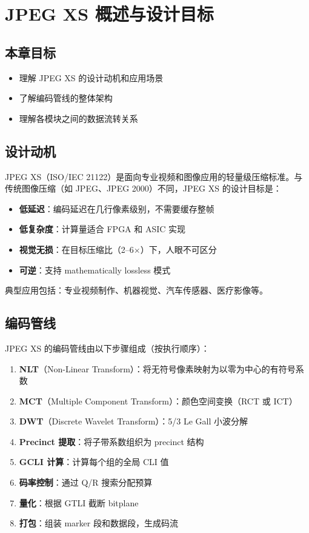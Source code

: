 
\chapter{JPEG XS 概述与设计目标}\label{ch:overview}

\section{本章目标}

\begin{itemize}
  \item 理解 JPEG XS 的设计动机和应用场景
  \item 了解编码管线的整体架构
  \item 理解各模块之间的数据流转关系
\end{itemize}

\section{设计动机}

JPEG XS（ISO/IEC 21122）是面向专业视频和图像应用的轻量级压缩标准。与传统图像压缩（如 JPEG、JPEG 2000）不同，JPEG XS 的设计目标是：

\begin{itemize}
  \item \textbf{低延迟}：编码延迟在几行像素级别，不需要缓存整帧
  \item \textbf{低复杂度}：计算量适合 FPGA 和 ASIC 实现
  \item \textbf{视觉无损}：在目标压缩比（2--6$\times$）下，人眼不可区分
  \item \textbf{可逆}：支持 mathematically lossless 模式
\end{itemize}

典型应用包括：专业视频制作、机器视觉、汽车传感器、医疗影像等。

\section{编码管线}

JPEG XS 的编码管线由以下步骤组成（按执行顺序）：

\begin{enumerate}
  \item \textbf{NLT}（Non-Linear Transform）：将无符号像素映射为以零为中心的有符号系数
  \item \textbf{MCT}（Multiple Component Transform）：颜色空间变换（RCT 或 ICT）
  \item \textbf{DWT}（Discrete Wavelet Transform）：5/3 Le Gall 小波分解
  \item \textbf{Precinct 提取}：将子带系数组织为 precinct 结构
  \item \textbf{GCLI 计算}：计算每个组的全局 CLI 值
  \item \textbf{码率控制}：通过 Q/R 搜索分配预算
  \item \textbf{量化}：根据 GTLI 截断 bitplane
  \item \textbf{打包}：组装 marker 段和数据段，生成码流
\end{enumerate}

